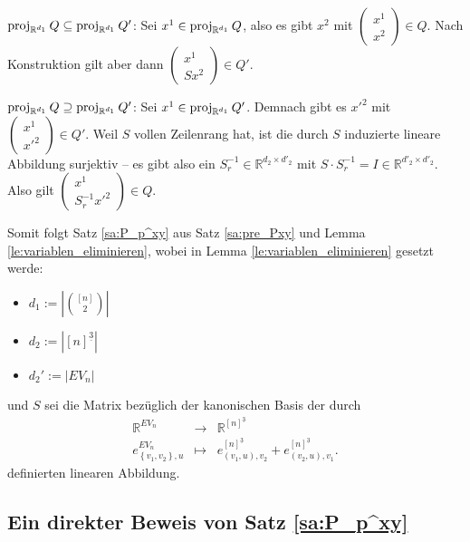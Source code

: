 \documentclass[10p,a4paper,BCOR = 12mm, DIV=15]{scrbook}
\begin{document}
{\begin{bew}
$\operatorname{proj}_{\mathbb{R}^{d_1}} Q \subseteq \operatorname{proj}_{\mathbb{R}^{d_1}} Q'$:
Sei $x^1 \in \operatorname{proj}_{\mathbb{R}^{d_1}} Q$, also es gibt $x^2$ mit $\left(\begin{array}{c}
x^1 \\
x^2
\end{array}\right) \in Q$. Nach Konstruktion gilt aber dann $\left(\begin{array}{c}
x^1 \\
S x^2
\end{array}\right) \in Q'$.

$\operatorname{proj}_{\mathbb{R}^{d_1}} Q \supseteq \operatorname{proj}_{\mathbb{R}^{d_1}} Q'$:
Sei $x^1 \in \operatorname{proj}_{\mathbb{R}^{d_1}} Q'$. Demnach gibt es $x'^2$ mit $\left(\begin{array}{c}
x^1 \\
x'^2
\end{array}\right) \in Q'$. Weil $S$ vollen Zeilenrang hat, ist die durch $S$ induzierte lineare Abbildung surjektiv -- es gibt also ein $S^{-1}_r \in \mathbb{R}^{d_2 \times d'_2}$ mit $S \cdot S^{-1}_r = I \in \mathbb{R}^{d'_2 \times d'_2}$. Also gilt
$\left(\begin{array}{c}
x^1 \\
S^{-1}_r x'^2
\end{array}\right) \in Q$.
\end{bew}

Somit folgt Satz \ref{sa:P_p^xy} aus Satz \ref{sa:pre_Pxy} und Lemma \ref{le:variablen_eliminieren}, wobei in Lemma \ref{le:variablen_eliminieren} gesetzt werde:
\begin{itemize}
\item $d_1 := \left|{\left[n\right] \choose 2}\right|$
\item $d_2 := \left|[n]^{\underline{3}}\right|$
\item $d_2' := \left|EV_n\right|$
\end{itemize}
und $S$ sei die Matrix bezüglich der kanonischen Basis der durch
\begin{eqnarray*}
\mathbb{R}^{EV_n} & \rightarrow & \mathbb{R}^{[n]^{\underline{3}}} \\
e^{EV_n}_{\left\{v_1, v_2\right\}, u} & \mapsto & e^{[n]^{\underline{3}}}_{\left(v_1, u\right), v_2}+e^{[n]^{\underline{3}}}_{\left(v_2, u\right), v_1}.
\end{eqnarray*}
definierten linearen Abbildung.

\subsection{Ein direkter Beweis von Satz \ref{sa:P_p^xy}}

}
\end{document}
